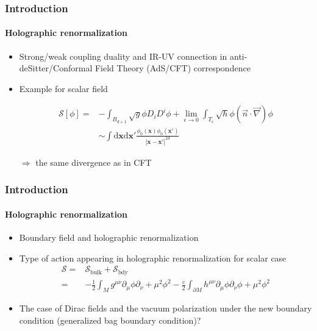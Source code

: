 \documentclass[french]{beamer}
\newcommand{\dd}[0]{\textrm{d}}
\begin{document}
\begin{frame}
\frametitle{Introduction}
\framesubtitle{Holographic renormalization}

\begin{itemize}
\item Strong/weak coupling duality and IR-UV connection in anti-deSitter/Conformal Field Theory (AdS/CFT) correspondence

\item Example for scalar field

\begin{equation*}
\begin{split}
\mathcal{S}[\phi] = & -\int_{B_{d+1}} \sqrt{g} \phi D_i D^i \phi + 
\lim_{\epsilon\rightarrow 0}\int_{T_\epsilon}  \sqrt{h} \phi (\vec{n}\cdot\vec{\nabla})\phi \\
%
& \sim \int \dd \mathbf{x} \dd \mathbf{x}' 
\frac{\phi_0(\mathbf{x})\phi_0(\mathbf{x}')}{|\mathbf{x} - \mathbf{x}'|^{2d}}
\end{split}
\end{equation*}

$\Rightarrow$ the same divergence as in CFT

\end{itemize}

\end{frame}
\begin{frame}
\frametitle{Introduction}
\framesubtitle{Holographic renormalization}

\begin{itemize}

\item Boundary field and holographic renormalization

\item Type of action appearing in holographic renormalization for scalar case
\begin{equation*}
\begin{split}
\mathcal{S} = & \mathcal{S}_{\mathrm{bulk}} + \mathcal{S}_{\mathrm{bdy}}
\\ = &
-\frac 1 2 \int_M g^{\mu\nu} \partial_\mu \phi \partial_{\nu} + 
\mu^2\phi^2 - \frac c 2 \int_{\partial M}h^{\mu\nu}\partial_\mu\phi\partial_\nu\phi + \mu^2\phi^2
\end{split}
\end{equation*}

\item The case of Dirac fields and the vacuum polarization under the new boundary condition (generalized bag boundary condition)?

\end{itemize}

\end{frame}
\end{document}
